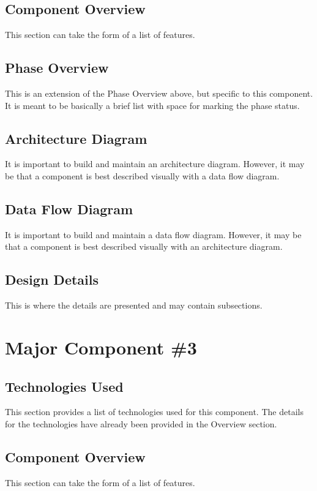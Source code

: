 \subsection{Component  Overview}
This section can take the form of a list of features. 

\subsection{Phase Overview}
This is an extension of the Phase Overview above, but specific to this component. 
 It is meant to be basically a brief list with space for marking the phase status. 

\subsection{ Architecture  Diagram}
It is important to build and maintain an architecture diagram.  However, it may 
be that a component is best described visually with a data flow diagram. 


\subsection{Data Flow Diagram}
It is important to build and maintain a data flow diagram.  However, it may be 
that a component is best described visually with an architecture diagram. 


\subsection{Design Details}
This is where the details are presented and may contain subsections. 


\section{Major Component \#3 }

\subsection{Technologies  Used}
This section provides a list of technologies used for this component.  The details 
for the technologies have already been provided in the Overview section. 

\subsection{Component  Overview}
This section can take the form of a list of features. 

